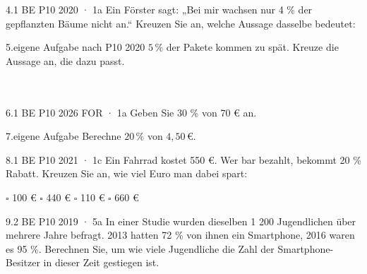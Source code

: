 \documentclass[11pt]{article}
\begin{document}
\begin{pfaufgabe}{4.}{1 BE \textperiodcentered{} P10 2020 · 1a}
Ein Förster sagt: „Bei mir wachsen nur 4 \% der gepflanzten Bäume nicht an.“ Kreuzen Sie an, welche Aussage dasselbe bedeutet:
\end{pfaufgabe}
\begin{pfaufgabe}{5.}{eigene Aufgabe nach P10 2020}
$5\,\%$ der Pakete kommen zu spät. Kreuze die Aussage an, die dazu passt.\\ \\ \\ 
\end{pfaufgabe}
\begin{pfaufgabe}{6.}{1 BE \textperiodcentered{} P10 2026 FOR · 1a}
Geben Sie 30 \% von 70 € an.
\end{pfaufgabe}
\begin{pfaufgabe}{7.}{eigene Aufgabe}
Berechne $20\,\%$ von $4{,}50\,€$.
\end{pfaufgabe}
\begin{pfaufgabe}{8.}{1 BE \textperiodcentered{} P10 2021 · 1c}
Ein Fahrrad kostet 550 €. Wer bar bezahlt, bekommt 20 \% Rabatt. Kreuzen Sie an, wie viel Euro man dabei spart:
\par\noindent\hspace*{1.6em}$\square$ 100 € \quad $\square$ 440 € \quad $\square$ 110 € \quad $\square$ 660 €\par
{}
\end{pfaufgabe}
\begin{pfaufgabe}{9.}{2 BE \textperiodcentered{} P10 2019 · 5a}
In einer Studie wurden dieselben 1 200 Jugendlichen über mehrere Jahre befragt. 2013 hatten 72 \% von ihnen ein Smartphone, 2016 waren es 95 \%. Berechnen Sie, um wie viele Jugendliche die Zahl der Smartphone-Besitzer in dieser Zeit gestiegen ist.
\end{pfaufgabe}
\end{document}
